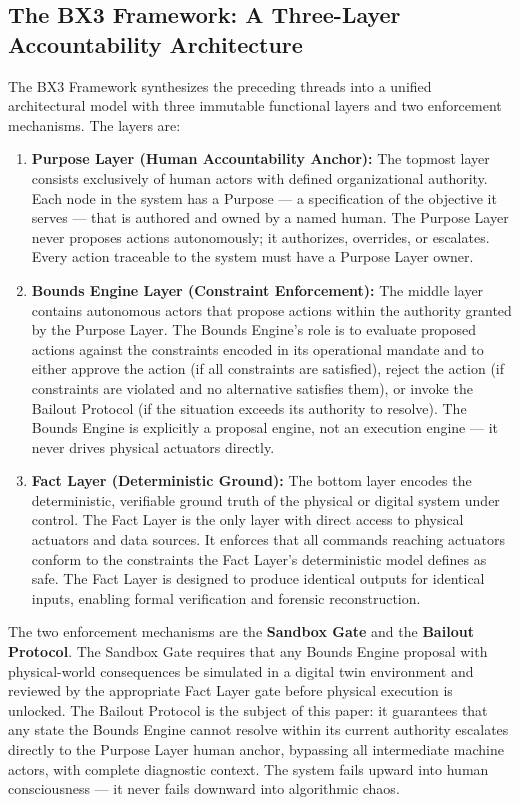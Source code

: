 \documentclass[12pt]{article}
\begin{document}
\subsection{The BX3 Framework: A Three-Layer Accountability Architecture}

The BX3 Framework synthesizes the preceding threads into a unified architectural model with three immutable functional layers and two enforcement mechanisms. The layers are:

\begin{enumerate}

\item \textbf{Purpose Layer (Human Accountability Anchor):} The topmost layer consists exclusively of human actors with defined organizational authority. Each node in the system has a Purpose --- a specification of the objective it serves --- that is authored and owned by a named human. The Purpose Layer never proposes actions autonomously; it authorizes, overrides, or escalates. Every action traceable to the system must have a Purpose Layer owner.

\item \textbf{Bounds Engine Layer (Constraint Enforcement):} The middle layer contains autonomous actors that propose actions within the authority granted by the Purpose Layer. The Bounds Engine's role is to evaluate proposed actions against the constraints encoded in its operational mandate and to either approve the action (if all constraints are satisfied), reject the action (if constraints are violated and no alternative satisfies them), or invoke the Bailout Protocol (if the situation exceeds its authority to resolve). The Bounds Engine is explicitly a proposal engine, not an execution engine --- it never drives physical actuators directly.

\item \textbf{Fact Layer (Deterministic Ground):} The bottom layer encodes the deterministic, verifiable ground truth of the physical or digital system under control. The Fact Layer is the only layer with direct access to physical actuators and data sources. It enforces that all commands reaching actuators conform to the constraints the Fact Layer's deterministic model defines as safe. The Fact Layer is designed to produce identical outputs for identical inputs, enabling formal verification and forensic reconstruction.

\end{enumerate}

The two enforcement mechanisms are the \textbf{Sandbox Gate} and the \textbf{Bailout Protocol}. The Sandbox Gate requires that any Bounds Engine proposal with physical-world consequences be simulated in a digital twin environment and reviewed by the appropriate Fact Layer gate before physical execution is unlocked. The Bailout Protocol is the subject of this paper: it guarantees that any state the Bounds Engine cannot resolve within its current authority escalates directly to the Purpose Layer human anchor, bypassing all intermediate machine actors, with complete diagnostic context. The system fails upward into human consciousness --- it never fails downward into algorithmic chaos.
\end{document}
